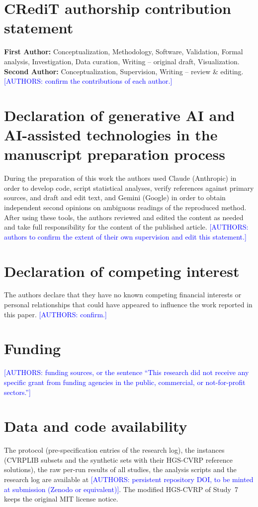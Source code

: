 \documentclass[preprint,11pt,authoryear]{elsarticle}
\newcommand{\authorpend}[1]{\textcolor{blue}{[AUTHORS: #1]}}   %
\begin{document}







\section*{CRediT authorship contribution statement}
\textbf{First Author:} Conceptualization, Methodology, Software, Validation, Formal analysis, Investigation, Data curation, Writing -- original draft, Visualization. \textbf{Second Author:} Conceptualization, Supervision, Writing -- review \& editing. \authorpend{confirm the contributions of each author.}

\section*{Declaration of generative AI and AI-assisted technologies in the manuscript preparation process}
During the preparation of this work the authors used Claude (Anthropic) in order to develop code, script statistical analyses, verify references against primary sources, and draft and edit text, and Gemini (Google) in order to obtain independent second opinions on ambiguous readings of the reproduced method. After using these tools, the authors reviewed and edited the content as needed and take full responsibility for the content of the published article. \authorpend{authors to confirm the extent of their own supervision and edit this statement.}

\section*{Declaration of competing interest}
The authors declare that they have no known competing financial interests or personal relationships that could have appeared to influence the work reported in this paper. \authorpend{confirm.}

\section*{Funding}
\authorpend{funding sources, or the sentence ``This research did not receive any specific grant from funding agencies in the public, commercial, or not-for-profit sectors.''}

\section*{Data and code availability}
The protocol (pre-specification entries of the research log), the instances (CVRPLIB subsets and the synthetic sets with their HGS-CVRP reference solutions), the raw per-run results of all studies, the analysis scripts and the research log are available at \authorpend{persistent repository DOI, to be minted at submission (Zenodo or equivalent)}. The modified HGS-CVRP of Study~7 keeps the original MIT license notice.
\end{document}
